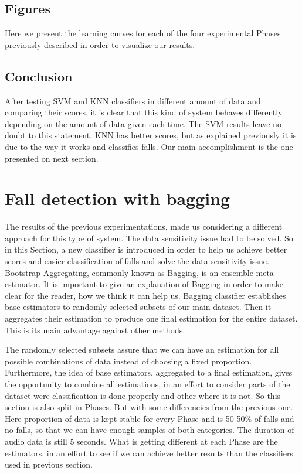 \documentclass[10pt, conference, compsocconf]{IEEEtran}
\begin{document}
\subsection{Figures}

Here we present the learning curves for each of the four experimental Phases previously described in order to visualize our results. 



\subsection{Conclusion}

After testing SVM and KNN classifiers in different amount of data and comparing their scores, it is clear that this kind of system behaves differently depending on the amount of data given each time. The SVM results leave no doubt to this statement. KNN has better scores, but as explained previously it is due to the way it works and classifies falls. Our main accomplishment is the one presented on next section.

\section{Fall detection with bagging} \label{BaggingFall}
 

The results of the previous experimentations, made us considering a different approach for this type of system. The data sensitivity issue had to be solved. So in this Section, a new classifier is introduced in order to help us achieve better scores and easier classification of falls and solve the data sensitivity issue. Bootstrap Aggregating, commonly known as Bagging, is an ensemble meta-estimator. It is important to give an explanation of Bagging in order to make clear for the reader, how we think it can help us. Bagging classifier establishes base estimators to randomly selected subsets of our main dataset. Then it aggregates their estimation to produce one final estimation for the entire dataset. This is its main advantage against other methods. 

The randomly selected subsets assure that we can have an estimation for all possible combinations of data instead of choosing a fixed proportion. Furthermore, the idea of base estimators, aggregated to a final estimation, gives the opportunity to combine all estimations, in an effort to consider parts of the dataset were classification is done properly and other where it is not. 
So this section is also split in Phases. But with some differencies from the previous one. Here proportion of data is kept stable for every Phase and is 50-50\% of falls and no falls, so that we can have enough samples of both categories. The duration of audio data is still 5 seconds. 
What is getting different at each Phase are the estimators, in an effort to see if we can achieve better results than the classifiers used in previous section. 
\end{document}
